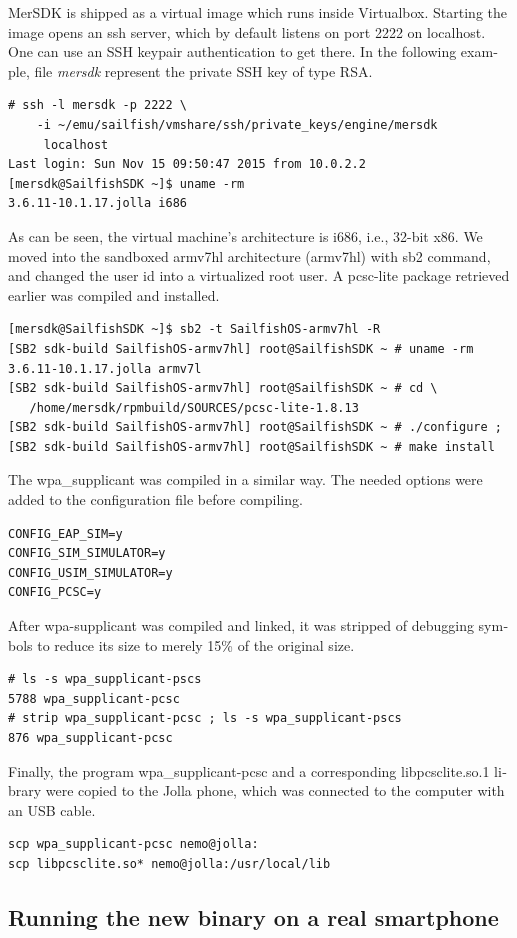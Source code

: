 \documentclass[12pt,a4paper,english]{tutthesis}
\begin{document}
\begin{otherlanguage}{english}
MerSDK is shipped as a virtual image which runs inside Virtualbox.
Starting the image opens an ssh server, which by default listens on
port 2222 on localhost. One can use an SSH keypair authentication to get there.
In the following example, file \emph{mersdk} represent the private SSH key of type RSA.
\begin{verbatim}
# ssh -l mersdk -p 2222 \
    -i ~/emu/sailfish/vmshare/ssh/private_keys/engine/mersdk
     localhost
Last login: Sun Nov 15 09:50:47 2015 from 10.0.2.2
[mersdk@SailfishSDK ~]$ uname -rm
3.6.11-10.1.17.jolla i686
\end{verbatim}
As can be seen, the virtual machine's architecture is i686, i.e.,
32-bit x86.
We moved into the sandboxed armv7hl architecture (armv7hl) with
sb2 command, and changed the user id into a virtualized root user.
A  pcsc-lite package retrieved  earlier  was compiled and installed. 
\begin{verbatim}
[mersdk@SailfishSDK ~]$ sb2 -t SailfishOS-armv7hl -R
[SB2 sdk-build SailfishOS-armv7hl] root@SailfishSDK ~ # uname -rm
3.6.11-10.1.17.jolla armv7l
[SB2 sdk-build SailfishOS-armv7hl] root@SailfishSDK ~ # cd \
   /home/mersdk/rpmbuild/SOURCES/pcsc-lite-1.8.13
[SB2 sdk-build SailfishOS-armv7hl] root@SailfishSDK ~ # ./configure ; 
[SB2 sdk-build SailfishOS-armv7hl] root@SailfishSDK ~ # make install
\end{verbatim}
The wpa\_supplicant was compiled in a similar way. The needed options were
added to the configuration file before compiling.
\begin{verbatim}
CONFIG_EAP_SIM=y
CONFIG_SIM_SIMULATOR=y
CONFIG_USIM_SIMULATOR=y
CONFIG_PCSC=y
\end{verbatim}
After wpa-supplicant was compiled and linked, it was stripped of 
debugging symbols to reduce its size to merely 15\% of the original size.
\begin{verbatim}
# ls -s wpa_supplicant-pscs
5788 wpa_supplicant-pcsc
# strip wpa_supplicant-pcsc ; ls -s wpa_supplicant-pscs
876 wpa_supplicant-pcsc
\end{verbatim}
Finally, the program wpa\_supplicant-pcsc and a corresponding
libpcsclite.so.1 library were copied to the Jolla phone, which was
connected to the computer with an USB cable.
\begin{verbatim}
scp wpa_supplicant-pcsc nemo@jolla:
scp libpcsclite.so* nemo@jolla:/usr/local/lib
\end{verbatim}


\subsection{Running the new binary on a real smartphone}
\label{sec-5-3-2}


\end{otherlanguage}
\end{document}
